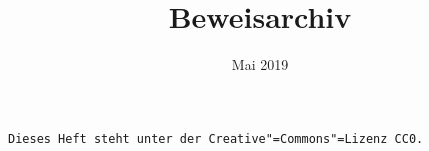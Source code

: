 \documentclass[a4paper,10pt,fleqn,twoside]{scrbook}
\title{Beweisarchiv}
\date{Mai 2019}
\numberwithin{equation}{chapter}
\theoremstyle{rmbox}
\begin{document}
\maketitle

\texttt{Dieses Heft steht unter der Creative"=Commons"=Lizenz CC0.}

\tableofcontents






\printindex
\end{document}
